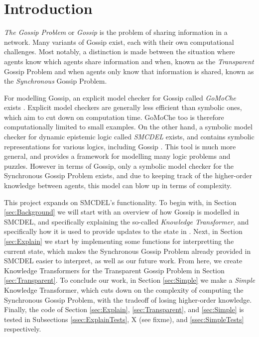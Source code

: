 \section{Introduction}

\textit{The Gossip Problem} or \textit{Gossip} is the problem of sharing information in a network. Many variants of Gossip exist, each with their own computational challenges. Most notably, a distinction is made between the situation where agents know which agents share information and when, known as the \textit{Transparent} Gossip Problem and when agents only know that information is shared, known as the \textit{Synchronous} Gossip Problem.

For modelling Gossip, an explicit model checker for Gossip called \textit{GoMoChe} exists \cite{gattinger2023gomoche}. Explicit model checkers are generally less efficient than symbolic ones, which aim to cut down on computation time. GoMoChe too is therefore computationally limited to small examples. On the other hand, a symbolic model checker for dynamic epistemic logic called \textit{SMCDEL} exists, and contains symbolic representations for various logics, including Gossip \cite{GattingerThesis2018}. This tool is much more general, and provides a framework for modelling many logic problems and puzzles. However in terms of Gossip, only a symbolic model checker for the Synchronous Gossip Problem exists, and due to keeping track of the higher-order knowledge between agents, this model can blow up in terms of complexity.

This project expands on SMCDEL's functionality. To begin with, in Section \ref{sec:Background} we will start with an overview of how Gossip is modelled in SMCDEL, and specifically explaining the so-called \textit{Knowledge Transformer}, and specifically how it is used to provide updates to the state in \cite{GattingerThesis2018}. Next, in Section \ref{sec:Explain} we start by implementing some functions for interpretting the current state, which makes the Synchronous Gossip Problem already provided in SMCDEL easier to interpret, as well as our future work. From here, we create Knowledge Transformers for the Transparent Gossip Problem in Section \ref{sec:Transparent}. To conclude our work, in Section \ref{sec:Simple} we make a \textit{Simple} Knowledge Transformer, which cuts down on the complexity of computing the Synchronous Gossip Problem, with the tradeoff of losing higher-order knowledge. Finally, the code of Section \ref{sec:Explain}, \ref{sec:Transparent}, and \ref{sec:Simple} is tested in Subsections \ref{ssec:ExplainTests}, X (see fixme), and \ref{ssec:SimpleTests} respectively.



